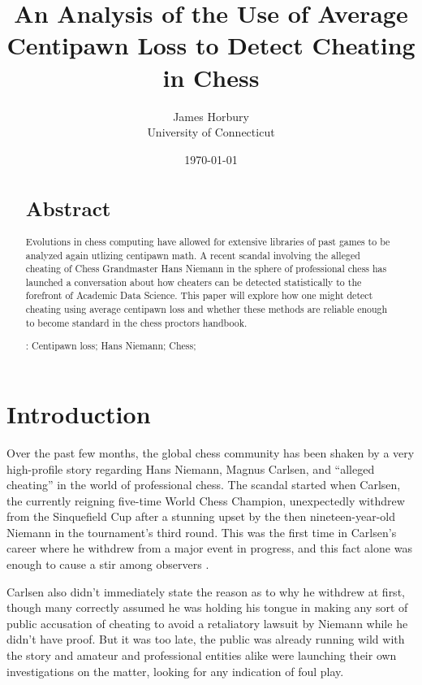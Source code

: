 \documentclass[12pt, letterpaper, titlepage]{article}
\title{An Analysis of the Use of Average Centipawn Loss to Detect Cheating in Chess}
\author{James Horbury\\
    University of Connecticut
}
\date{\today}
\begin{document}
\maketitle

\doublespace

\begin{abstract}
\section*{Abstract}
\label{sec:abs}

Evolutions in chess computing have allowed for extensive libraries of past games to be analyzed again utlizing 
centipawn math. A recent scandal involving the alleged cheating of Chess Grandmaster Hans Niemann in the 
sphere of professional chess has launched a conversation about how cheaters can be detected statistically 
to the forefront of Academic Data Science. This paper will explore how one might detect cheating using average
 centipawn loss and whether these methods are reliable enough to become standard in the chess proctors handbook.

\bigskip
\noindent{}:
Centipawn loss; 
Hans Niemann;
Chess;
\end{abstract}

\section*{Introduction}
\label{sec:intro}

Over the past few months, the global chess community has been shaken by a very high-profile story regarding 
Hans Niemann, Magnus Carlsen,  and “alleged cheating” in the world of professional chess. The scandal started
 when Carlsen, the currently reigning five-time World Chess Champion, unexpectedly withdrew from the 
 Sinquefield Cup after a stunning upset by the then nineteen-year-old Niemann in the tournament's third 
 round. This was the first time in Carlsen's career where he withdrew from a major event in progress, and 
 this fact alone was enough to cause a stir among observers \citep{wsj2022}.

Carlsen also didn't immediately state the reason as to why he withdrew at first, though many correctly 
assumed he was holding his tongue in making any sort of public accusation of cheating to avoid a retaliatory 
lawsuit by Niemann while he didn't have proof. But it was too late, the public was already running wild with 
the story and amateur and professional entities alike were launching their own investigations on the matter, 
looking for any indication of foul play.
\end{document}
